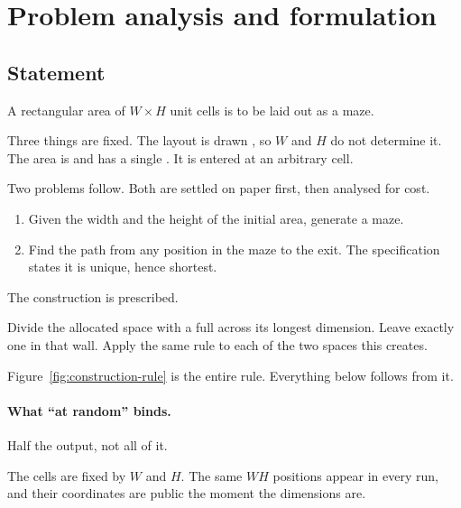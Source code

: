 \section{Problem analysis and formulation}
\label{sec:problem-formulation}

\subsection{Statement}

A rectangular area of $W\times H$ unit cells is to be laid out as a maze.

Three things are fixed. The layout is drawn , so $W$ and $H$
do not determine it. The area is  and has a single
. It is entered at an arbitrary cell.

Two problems follow. Both are settled on paper first, then analysed for cost.

\begin{enumerate}[label=\arabic*.,leftmargin=*,itemsep=2pt]
  \item Given the width and the height of the initial area, generate a maze.
  \item Find the path from any position in the maze to the exit. The
        specification states it is unique, hence shortest.
\end{enumerate}

The construction is prescribed.

\begin{keypoint}
Divide the allocated space with a full  across its longest
dimension. Leave exactly one  in that wall. Apply the same rule
to each of the two spaces this creates.
\end{keypoint}

Figure~\ref{fig:construction-rule} is the entire rule. Everything below follows
from it.



\paragraph{What ``at random'' binds.}
Half the output, not all of it.

The cells are fixed by $W$ and $H$. The same $WH$ positions appear in every run,
and their coordinates are public the moment the dimensions are.


